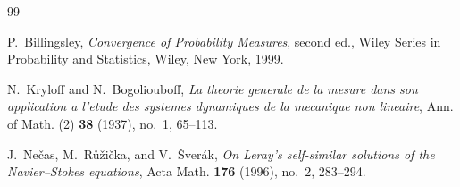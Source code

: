 \documentclass[11pt]{amsart}
\theoremstyle{plain}
\theoremstyle{definition}
\theoremstyle{remark}
\numberwithin{equation}{section}
\begin{document}
\begin{thebibliography}{99}

P.~Billingsley,
\emph{Convergence of Probability Measures},
second ed., Wiley Series in Probability and Statistics, Wiley, New York, 1999.

N.~Kryloff and N.~Bogoliouboff,
\emph{La theorie generale de la mesure dans son application a l'etude des
systemes dynamiques de la mecanique non lineaire},
Ann. of Math. (2) \textbf{38} (1937), no.~1, 65--113.

J.~Ne\v{c}as, M.~R\r{u}\v{z}i\v{c}ka, and V.~\v{S}ver\'ak,
\emph{On Leray's self-similar solutions of the Navier--Stokes equations},
Acta Math. \textbf{176} (1996), no.~2, 283--294.

\end{thebibliography}
\end{document}
